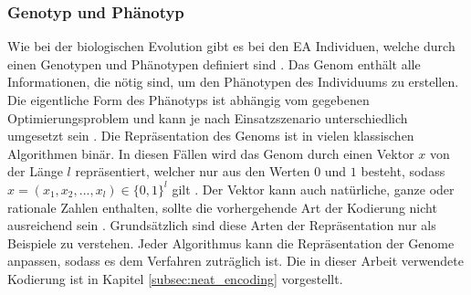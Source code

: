 \subsubsection{Genotyp und Phänotyp}
Wie bei der biologischen Evolution gibt es bei den \ac{EA} Individuen, welche durch einen Genotypen und Phänotypen definiert sind \cite{weicker2015evolutionare}. Das Genom enthält alle Informationen, die nötig sind, um den Phänotypen des Individuums zu erstellen. Die eigentliche Form des Phänotyps ist abhängig vom gegebenen Optimierungsproblem und kann je nach Einsatzszenario unterschiedlich umgesetzt sein \cite{rothlauf2006representation}. Die Repräsentation des Genoms ist in vielen klassischen Algorithmen binär. In diesen Fällen wird das Genom durch einen Vektor $x$ von der Länge $l$ repräsentiert, welcher nur aus den Werten $0$ und $1$ besteht, sodass $x= (x_1, x_2, ..., x_l) \in \{0, 1\}^l$ gilt \cite{rothlauf2006representation}. Der Vektor kann auch natürliche, ganze oder rationale Zahlen enthalten, sollte die vorhergehende Art der Kodierung nicht ausreichend sein \cite{rothlauf2006representation}. Grundsätzlich sind diese Arten der Repräsentation nur als Beispiele zu verstehen. Jeder Algorithmus kann die Repräsentation der Genome anpassen, sodass es dem Verfahren zuträglich ist. Die in dieser Arbeit verwendete Kodierung ist in Kapitel \ref{subsec:neat_encoding} vorgestellt. 

